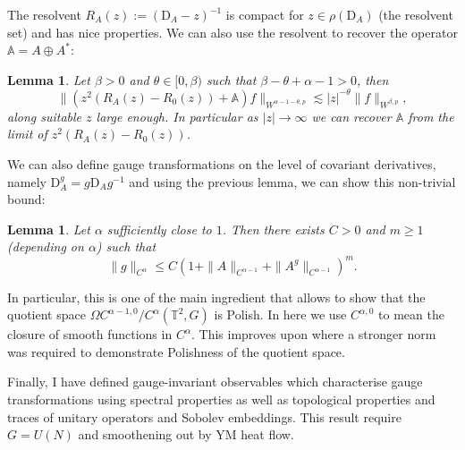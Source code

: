 \documentclass[12pt]{article}
\numberwithin{equation}{section}
\newtheorem{lemma}[theorem]{Lemma}
\theoremstyle{definition}
\theoremstyle{remark}
\newcommand{\1}{\mathbf 1}
\newcommand{\<}{\langle}
\renewcommand{\>}{\rangle}
\newcommand{\bA}{\mathbb A}
\newcommand{\rmD}{\mathrm{D}}
\newcommand{\bT}{\mathbb T}
\begin{document}
The resolvent $R_A(z):=(\rmD_A-z)^{-1}$ is compact for $z\in \rho(\rmD_A)$ (the resolvent set) and has nice properties. We can also use the resolvent to recover the operator $\bA=A\oplus A^*$:
\begin{lemma}\label{lem:recover_A_Young}
Let $\beta>0$  and $\theta\in [0,\beta)$ such that  $\beta-\theta+\alpha-1>0$, then 
\[
\|(z^2(R_A(z)-R_0(z))+\bA)f\|_{W^{\alpha-1-\theta,p}}\lesssim |z|^{-\theta}\|f\|_{W^{\beta,p}},
\]
along suitable $z$ large enough. In particular as $|z|\to\infty$ we can recover $\bA$ from the limit of $z^2(R_A(z)-R_0(z))$. 
\end{lemma}

We can also define gauge transformations on the level of covariant derivatives, namely $\rmD_A^g=g\rmD_A g^{-1}$ and using the previous lemma, we can show this non-trivial bound:
\begin{lemma}
 Let $\alpha$ sufficiently close to $1$. Then there exists $C>0$ and $m\geq 1$ (depending on $\alpha$) such that 
 \[
 \|g\|_{C^{\alpha}}\leq C(1+\|A\|_{C^{\alpha-1}}+\|A^g\|_{C^{\alpha-1}})^m.
 \]
\end{lemma}
In particular, this is one of the main ingredient that allows to show that the quotient space $\Omega C^{\alpha-1,0}/C^\alpha(\bT^2,G)$ is Polish. In here we use $C^{\alpha,0}$ to mean the closure of smooth functions in $C^\alpha$. This improves upon \cite{CCHS2d} where a stronger norm was required to demonstrate Polishness of the quotient space.  

Finally, I have defined gauge-invariant observables which characterise gauge transformations using spectral properties as well as topological properties and traces of unitary operators and Sobolev embeddings. This result require $G=U(N)$ and smoothening out by YM heat flow. 





\end{document}
